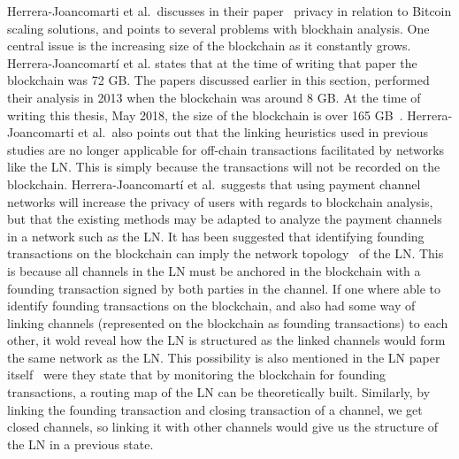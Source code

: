 Herrera-Joancomarti et al.~discusses in their paper~\cite{herrera2016privacy} privacy in relation to Bitcoin scaling solutions, and points to several problems with blockhain analysis. One central issue is the increasing size of the blockchain as it constantly grows. Herrera-Joancomartí et al. states that at the time of writing that paper the blockchain was 72 GB. The papers discussed earlier in this section, performed their analysis in 2013 when the blockchain was around 8 GB. At the time of writing this thesis, May 2018, the size of the blockchain is over 165 GB~\cite{blockchain_size}.
Herrera-Joancomarti et al.~also points out that the linking heuristics used in previous studies are no longer applicable for off-chain transactions facilitated by networks like the LN. This is simply because the transactions will not be recorded on the blockchain. Herrera-Joancomartí et al.~suggests that using payment channel networks will increase the privacy of users with regards to blockchain analysis, but that the existing methods may be adapted to analyze the payment channels in a network such as the LN. 
It has been suggested that identifying founding transactions on the blockchain can imply the network topology~\cite{rusty_routing1} of the LN. This is because all channels in the LN must be anchored in the blockchain with a founding transaction signed by both parties in the channel. If one where able to identify founding transactions on the blockchain, and also had some way of linking channels (represented on the blockchain as founding transactions) to each other, it wold reveal how the LN is structured as the linked channels would form the same network as the LN. This possibility is also mentioned in the LN paper itself~\cite{poon2015bitcoin} were they state that by monitoring the blockchain for founding transactions, a routing map of the LN can be theoretically built.
Similarly, by linking the founding transaction and closing transaction of a channel, we get closed channels, so linking it with other channels would give us the structure of the LN in a previous state. 


